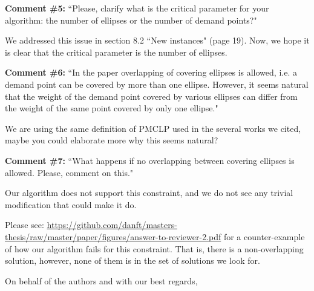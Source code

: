 \documentclass[letterpaper]{letter}
\begin{document}
\begin{letter}{}
		\textbf{Comment \#5:} ``Please, clarify what is the critical parameter for your algorithm: the number of ellipses or the number of demand points?"
		
		We addressed this issue in section 8.2 ``New instances" (page 19). Now, we hope it is clear that the critical parameter is the number of ellipses.
		
		\textbf{Comment \#6:} ``In the paper overlapping of covering ellipses is allowed, i.e. a demand point can be covered by more than one ellipse. However, it seems natural that the weight of the demand point covered by various ellipses can differ from the weight of the same point covered by only one ellipse."
		
		We are using the same definition of PMCLP used in the several works we cited, maybe you could elaborate more why this seems natural?
		
		\textbf{Comment \#7:} ``What happens if no overlapping between covering ellipses is allowed. Please, comment on this."
		
		Our algorithm does not support this constraint, and we do not see any trivial modification that could make it do.
		
		Please see: \href{https://github.com/danft/masters-thesis/raw/master/paper/figures/answer-to-reviewer-2.pdf}{https://github.com/danft/masters-thesis/raw/master/paper/figures/answer-to-reviewer-2.pdf} for a counter-example of how our algorithm fails for this constraint. That is, there is a non-overlapping solution, however, none of them is in the set of solutions we look for.
		
		\closing{On behalf of the authors and with our best regards,}
			\end{letter}
		
\end{document}
